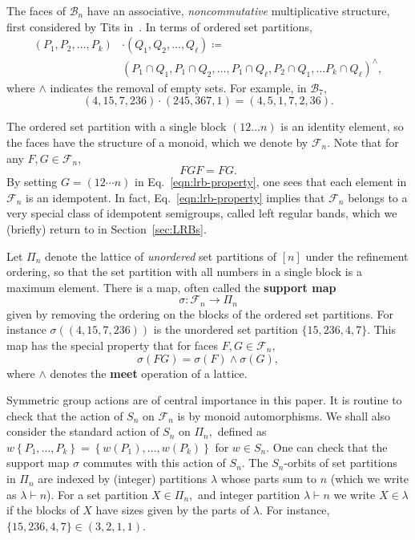 \documentclass[ALCO, Unicode]{cedram}
\begin{document}
The faces of $\mathcal{B}_n$ have an associative, \textit{noncommutative} multiplicative structure, first considered by Tits in~\cite{TITS1976265}. In terms of ordered set partitions, 
\begin{align*}\left(P_1, P_2, \ldots, P_k \right) &\cdot \left(Q_1, Q_2, \ldots, Q_\ell\right)  \coloneqq \\ &\left(P_1 \cap Q_1, P_1 \cap Q_2, \ldots, P_1 \cap Q_\ell, P_2 \cap Q_1, \ldots P_k \cap Q_\ell \right)^{\wedge},\end{align*} where $\wedge$ indicates the removal of empty sets. For example, in $\mathcal{B}_7,$
\[(4, 15, 7, 236) \cdot (245, 367, 1) = (4, 5, 1, 7, 2, 36).\] 

The ordered set partition with a single block $(12\ldots n)$ is an identity element, so the faces have the structure of a monoid, which we denote by \textbf{$\mathcal{F}_n.$} Note that for any $F, G \in \mathcal{F}_n,$
\begin{equation}\label{eqn:lrb-property}
    FGF = FG.
\end{equation}
 By setting $G = (12 \cdots n)$ in Eq.~\eqref{eqn:lrb-property}, one sees that each element in $\mathcal{F}_n$ is an idempotent. In fact,  Eq.~\eqref{eqn:lrb-property} implies that $\mathcal{F}_n$ belongs to a very special class of idempotent semigroups, called left regular bands, which we (briefly) return to in Section~\ref{sec:LRBs}.

Let \textbf{$\Pi_n$} denote the lattice of \textit{unordered} set partitions of $[n]$ under the refinement ordering, so that the set partition with all numbers in a single block is a maximum element. There is a map, often called the \textbf{support map} $$\sigma: \mathcal{F}_n \to \Pi_n$$
given by removing the ordering on the blocks of the ordered set partitions. For instance $\sigma\left(\left(4, 15, 7, 236\right)\right)$ is the unordered set partition $\{15, 236, 4, 7\}.$ This map has the special property that for faces $F, G\in \mathcal{F}_n,$ 
\begin{equation}\label{eqn:multipy-faces-meet}
    \sigma(FG) = \sigma(F) \wedge \sigma(G),
\end{equation}
 where $\wedge$ denotes the \textbf{meet} operation of a lattice.

Symmetric group actions are of central importance in this paper. It is routine to check that the action of $S_n$ on $\mathcal{F}_n$ is by monoid automorphisms. We shall also consider the standard action of $S_n$ on $\Pi_n,$ defined as $w\left\{P_1, \ldots, P_k\right\}=
\left\{w(P_1), \ldots, w(P_k)\right\}
$ for $w \in S_n.$ One can check that the support map $\sigma$ commutes with this action of $S_n$. The $S_n$-orbits of set partitions in $\Pi_n$ are indexed by (integer) partitions $\lambda$ whose parts sum to $n$ (which we write as \textbf{$\lambda \vdash n$}).  For a set partition $X \in \Pi_n,$ and integer partition $\lambda \vdash n$ we write \textbf{$X \in \lambda$} if the blocks of $X$ have sizes given by the parts of $\lambda.$ For instance, $\{15, 236, 4, 7\} \in (3, 2, 1, 1).$
\end{document}
